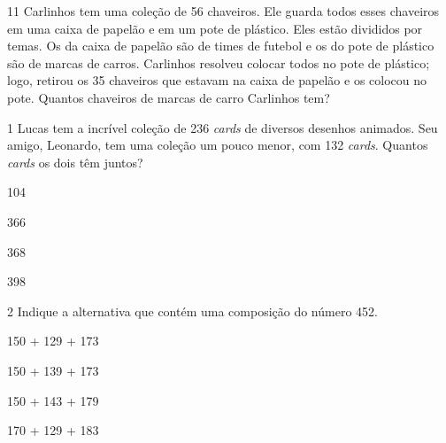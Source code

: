 \num{11} Carlinhos tem uma coleção de 56 chaveiros. Ele guarda todos esses
chaveiros em uma caixa de papelão e em um pote de plástico. Eles estão
divididos por temas. Os da caixa de papelão são de times de futebol e os
do pote de plástico são de marcas de carros. Carlinhos resolveu colocar
todos no pote de plástico; logo, retirou os 35 chaveiros que estavam na
caixa de papelão e os colocou no pote. Quantos chaveiros de marcas de
carro Carlinhos tem?



\num{1} Lucas tem a incrível coleção de 236 \emph{cards} de diversos desenhos
animados. Seu amigo, Leonardo, tem uma coleção um pouco menor, com 132
\emph{cards}. Quantos \emph{cards} os dois têm juntos?

\begin{minipage}{.5\textwidth}
\begin{escolha}
\item 104

\item 366

\item 368

\item 398
\end{escolha}
\end{minipage}

\num{2} Indique a alternativa que contém uma composição do número 452.

\begin{minipage}{.5\textwidth}
\begin{escolha}
\item 150 + 129 + 173

\item 150 + 139 + 173

\item 150 + 143 + 179

\item 170 + 129 + 183
\end{escolha}
\end{minipage}

